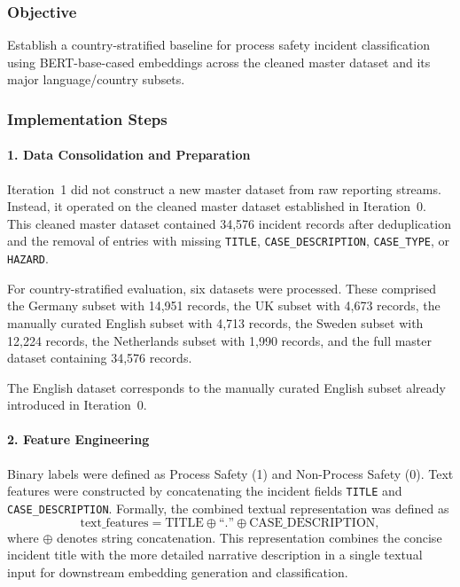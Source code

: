 \documentclass[11pt, titlepage, bibliography=totoc]{scrreprt}
\begin{document}
\subsubsection{Objective}
Establish a country-stratified baseline for process safety incident classification using BERT-base-cased embeddings across the cleaned master dataset and its major language/country subsets.

\subsubsection{Implementation Steps}

\paragraph{1. Data Consolidation and Preparation}
Iteration~1 did not construct a new master dataset from raw reporting streams. Instead, it operated on the cleaned master dataset established in Iteration~0. This cleaned master dataset contained 34,576 incident records after deduplication and the removal of entries with missing \texttt{TITLE}, \texttt{CASE\_DESCRIPTION}, \texttt{CASE\_TYPE}, or \texttt{HAZARD}.

For country-stratified evaluation, six datasets were processed. These comprised the Germany subset with 14,951 records, the UK subset with 4,673 records, the manually curated English subset with 4,713 records, the Sweden subset with 12,224 records, the Netherlands subset with 1,990 records, and the full master dataset containing 34,576 records.

The English dataset corresponds to the manually curated English subset already introduced in Iteration~0.

\paragraph{2. Feature Engineering}
Binary labels were defined as Process Safety (1) and Non-Process Safety (0). Text features were constructed by concatenating the incident fields \texttt{TITLE} and \texttt{CASE\_DESCRIPTION}. Formally, the combined textual representation was defined as
\begin{equation}
\text{text\_features} = \text{TITLE} \oplus \text{``.''} \oplus \text{CASE\_DESCRIPTION},
\end{equation}
where \(\oplus\) denotes string concatenation. This representation combines the concise incident title with the more detailed narrative description in a single textual input for downstream embedding generation and classification.
\end{document}
